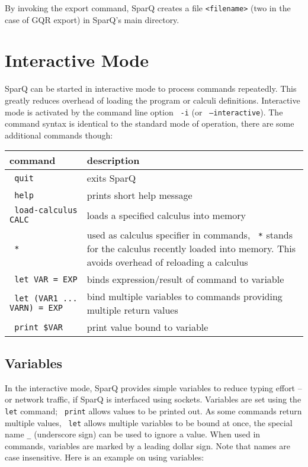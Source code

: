 \documentclass[headsepline]{scrreprt}
\theoremstyle{definition}
\newcommand{\engine}{SparQ}
\begin{document}
By invoking the export command, \engine{} creates a file \verb=<filename>= (two in the case of GQR export) in \engine{}'s main directory.


\section{Interactive Mode}\label{sec:interactive}

\engine{} can be started in interactive mode to process commands repeatedly. This greatly reduces
overhead of loading the program or calculi definitions. Interactive mode is activated by the command line option \texttt{ -i} (or \texttt{ --interactive}). The command syntax is identical to the standard mode of operation, there are some additional commands though:\pagebreak[4]

\begin{center}
\begin{longtable}{|lp{9cm}|}\hline
	{\bfseries command} & {\bfseries description} \\ \hline \hline
	\texttt{ quit} & exits \engine{}\\
	\texttt{ help} & prints short help message\\
	\texttt{ load-calculus CALC} & loads a specified calculus into memory\\
	\texttt{ *} & used as calculus specifier in commands, \texttt{ *} stands for the calculus recently loaded into memory. This avoids overhead of reloading a calculus\\
	\texttt{ let VAR = EXP} & binds expression/result of command to variable\\
	\texttt{ let (VAR1 ... VARN) = EXP} & bind multiple variables to commands providing multiple return values\\
	\texttt{ print \$VAR} & print value bound to variable\\
	 \hline
\end{longtable}
\end{center}

\subsection{Variables}
In the interactive mode, \engine{} provides simple variables to reduce typing effort -- or network traffic, if \engine{} is interfaced using sockets. 
Variables are set using the \texttt{ let} command; \texttt{ print} allows values to be printed out. 
As some commands return multiple values, \texttt{ let} allows multiple variables to be bound at once, the special name \verb=_= (underscore sign) can be used to ignore a value.
When used in commands, variables are marked by a leading dollar sign. Note that names are case insensitive. Here is an example on using variables:
\end{document}
